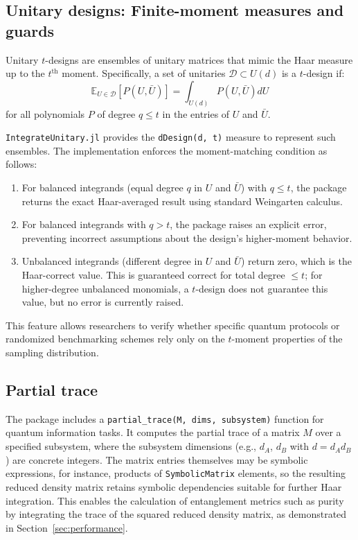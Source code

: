\documentclass[manuscript,screen]{acmart}
\begin{document}
\subsection{Unitary designs: Finite-moment measures and guards}
Unitary $t$-designs \cite{dankert2009exact, gross2007evenly,
ambainis2007quantum} are ensembles of unitary matrices that mimic the Haar
measure up to the $t^\mathrm{th}$ moment. Specifically, a set of unitaries
$\mathcal{D} \subset U(d)$ is a $t$-design if:
\begin{equation}
\mathbb{E}_{U \in \mathcal{D}} [P(U, \bar{U})] = \int_{U(d)} P(U, \bar{U}) dU
\end{equation}
for all polynomials $P$ of degree $q \le t$ in the entries of $U$ and $\bar{U}$.

\texttt{IntegrateUnitary.jl} provides the \texttt{dDesign(d, t)} measure to represent
such ensembles. The implementation enforces the moment-matching condition as
follows:
\begin{enumerate}
    \item For balanced integrands (equal degree $q$ in $U$ and $\bar{U}$) with
    $q \le t$, the package returns the exact Haar-averaged result using standard
    Weingarten calculus.
    \item For balanced integrands with $q > t$, the package raises an explicit
    error, preventing incorrect assumptions about the design's higher-moment
    behavior.
    \item Unbalanced integrands (different degree in $U$ and $\bar{U}$) return
    zero, which is the Haar-correct value. This is guaranteed correct for total
    degree $\le t$; for higher-degree unbalanced monomials, a $t$-design does
    not guarantee this value, but no error is currently raised.
\end{enumerate}
This feature allows researchers to verify whether specific quantum protocols or
randomized benchmarking schemes rely only on the $t$-moment properties of the
sampling distribution.

\subsection{Partial trace}
The package includes a \texttt{partial\_trace(M, dims, subsystem)} function
for quantum information tasks. It computes the partial trace of a matrix
$M$ over a specified subsystem, where the subsystem dimensions
(e.g., $d_A$, $d_B$ with $d = d_A d_B$) are concrete integers. The
matrix entries themselves may be symbolic expressions, for instance,
products of \texttt{SymbolicMatrix} elements, so the resulting reduced
density matrix retains symbolic dependencies suitable for further Haar
integration. This enables the calculation of entanglement metrics such as
purity by integrating the trace of the squared reduced density matrix, as
demonstrated in Section~\ref{sec:performance}.
\end{document}
